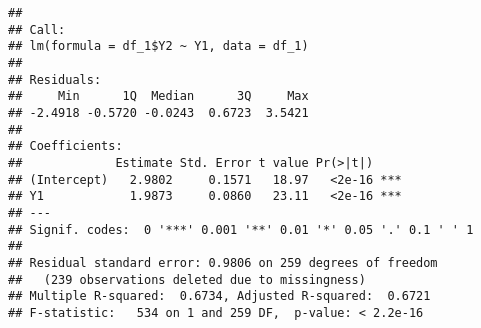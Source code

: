 \documentclass[
]{article}
\newenvironment{Shaded}{\begin{snugshade}}{\end{snugshade}}
\newcommand{\DataTypeTok}[1]{\textcolor[rgb]{0.13,0.29,0.53}{#1}}
\newcommand{\DecValTok}[1]{\textcolor[rgb]{0.00,0.00,0.81}{#1}}
\newcommand{\FloatTok}[1]{\textcolor[rgb]{0.00,0.00,0.81}{#1}}
\newcommand{\KeywordTok}[1]{\textcolor[rgb]{0.13,0.29,0.53}{\textbf{#1}}}
\newcommand{\NormalTok}[1]{#1}
\newcommand{\OperatorTok}[1]{\textcolor[rgb]{0.81,0.36,0.00}{\textbf{#1}}}
\newcommand{\StringTok}[1]{\textcolor[rgb]{0.31,0.60,0.02}{#1}}
\begin{document}
\begin{verbatim}
## 
## Call:
## lm(formula = df_1$Y2 ~ Y1, data = df_1)
## 
## Residuals:
##     Min      1Q  Median      3Q     Max 
## -2.4918 -0.5720 -0.0243  0.6723  3.5421 
## 
## Coefficients:
##             Estimate Std. Error t value Pr(>|t|)    
## (Intercept)   2.9802     0.1571   18.97   <2e-16 ***
## Y1            1.9873     0.0860   23.11   <2e-16 ***
## ---
## Signif. codes:  0 '***' 0.001 '**' 0.01 '*' 0.05 '.' 0.1 ' ' 1
## 
## Residual standard error: 0.9806 on 259 degrees of freedom
##   (239 observations deleted due to missingness)
## Multiple R-squared:  0.6734, Adjusted R-squared:  0.6721 
## F-statistic:   534 on 1 and 259 DF,  p-value: < 2.2e-16
\end{verbatim}

\begin{Shaded}
\end{Shaded}
\end{document}
